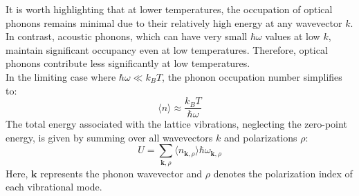 It is worth highlighting that at lower temperatures, the occupation of optical phonons remains minimal due to their relatively high energy at any wavevector $k$. In contrast, acoustic phonons, which can have very small $\hbar \omega$ values at low $k$, maintain significant occupancy even at low temperatures. Therefore, optical phonons contribute less significantly at low temperatures.\\
In the limiting case where $\hbar \omega \ll k_B T$, the phonon occupation number simplifies to:
\begin{equation}
	\langle n \rangle \approx \frac{k_B T}{\hbar \omega}
\end{equation}
The total energy associated with the lattice vibrations, neglecting the zero-point energy, is given by summing over all wavevectors $k$ and polarizations $\rho$:
\begin{equation}
	U = \sum_{\mathbf{k}, \rho} \langle n_{\mathbf{k}, \rho} \rangle \hbar \omega_{\mathbf{k}, \rho}
\end{equation}
Here, $\mathbf{k}$ represents the phonon wavevector and $\rho$ denotes the polarization index of each vibrational mode.

